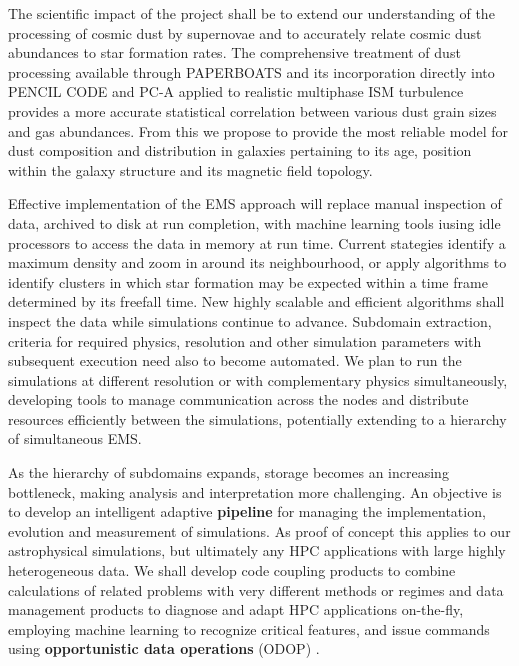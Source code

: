 \documentclass[a4paper,12pt]{article}
\begin{document}
The scientific impact of the project shall be to extend our
understanding of the processing of cosmic dust by supernovae and to accurately
relate cosmic dust abundances to star formation rates. The comprehensive
treatment of dust processing available through PAPERBOATS and its incorporation
directly into PENCIL CODE and PC-A applied to realistic multiphase ISM
turbulence provides a more accurate statistical correlation between various
dust grain sizes and gas abundances. From this we propose to provide the most
reliable model for dust composition and distribution in galaxies pertaining to
its age, position within the galaxy structure and its magnetic field topology.

Effective implementation of the EMS approach will replace manual
inspection of data, archived to disk at run completion, with
machine learning tools iusing idle processors to access the data in memory at run time.
Current stategies identify a maximum density and
zoom in around its neighbourhood, or apply algorithms to identify
clusters in which star formation may be expected within a
time frame determined by its freefall time. New highly scalable and
efficient algorithms shall inspect the data while simulations continue to advance.
Subdomain extraction, 
criteria for required physics, resolution and other
simulation parameters with subsequent execution need also to become automated.  We plan to run the
simulations at different resolution or with complementary physics
simultaneously, developing tools to manage communication across the nodes and
distribute resources efficiently between the simulations, potentially extending
to a hierarchy of simultaneous EMS.

As the hierarchy of subdomains expands, storage becomes an increasing
bottleneck, making analysis and interpretation more challenging.  An objective
is to develop an intelligent adaptive \textbf{pipeline} for managing the
implementation, evolution and measurement of simulations. As proof of concept
this applies to our astrophysical simulations, but ultimately any HPC
applications with large highly heterogeneous data.  We shall develop code
coupling products to combine calculations of related problems with very
different methods or regimes and data management products to diagnose and adapt
HPC applications on-the-fly, employing machine learning to recognize critical
features, and issue commands using \textbf{opportunistic data operations}
(ODOP) \citep{odop24}.
\end{document}
